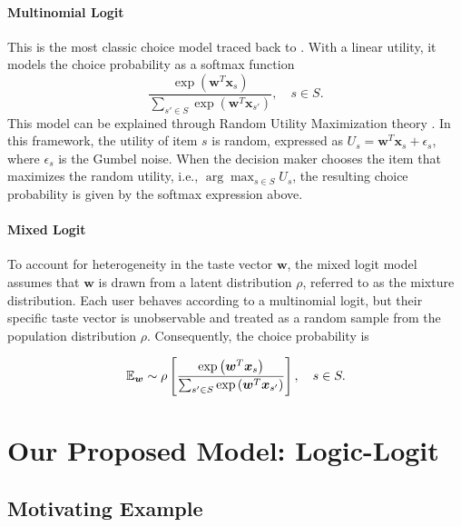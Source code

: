 \documentclass{article} %
\begin{document}
%
%
%

%
%
%
%
%

%

\paragraph{Multinomial Logit} This is the most classic choice model traced back to \cite{plackett1975analysis,luce1959individual}.
%
%
%
%
%
With a linear utility, it models the choice probability as a softmax function
$$
%
\frac{\exp \left(\boldsymbol{w}^T \boldsymbol{x}_{s}\right)}{\sum_{s' \in S} \exp \left(\boldsymbol{w}^T \boldsymbol{x}_{s'}\right)},\quad s \in S.
$$
This model can be explained through Random Utility Maximization theory \citep{mcfadden1981econometric}. In this framework, the utility of item $s$ is random, expressed as $U_s = \boldsymbol{w}^T \boldsymbol{x}_s+\epsilon_s$, where $\epsilon_s$ is the Gumbel noise. 
When the decision maker chooses the item that maximizes the random utility, i.e., $\arg \max _{s \in S} U_s$, the resulting choice probability is given by the softmax expression above.
%

%

\paragraph{Mixed Logit} 

To account for heterogeneity in the taste vector $\boldsymbol{w}$, the mixed logit model assumes that $\boldsymbol{w}$ is drawn from a latent distribution $\rho$, referred to as the mixture distribution. Each user behaves according to a multinomial logit, but their specific taste vector is unobservable and treated as a random sample from the population distribution $\rho$. Consequently, the choice probability is


$$
%
\E_{\boldsymbol{w}}\sim\rho\left[\frac{\exp \left(\boldsymbol{w}^T \boldsymbol{x}_{s}\right)}{\sum_{s' \in S} \exp \left(\boldsymbol{w}^T \boldsymbol{x}_{s'}\right)}\right],\quad s \in S.
$$

%
%
%
%
%



\section{Our Proposed Model: Logic-Logit} 

\subsection{Motivating Example}
%
\end{document}
